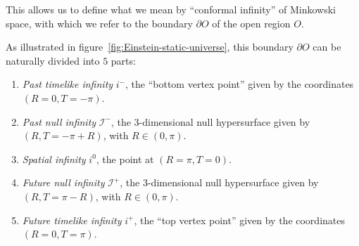 This allows us to define what we mean by ``conformal infinity'' of Minkowski space, with which we refer to the boundary \(\partial O\) of the open region \(O\).


As illustrated in figure~\ref{fig:Einstein-static-universe}, this boundary \(\partial O\) can be naturally divided into \(5\) parts:
\begin{enumerate}[label=(\arabic*)]
	\item \emph{Past timelike infinity} \(i^{-}\), the ``bottom vertex point'' given by the coordinates \((R = 0, T = -\pi)\).
	\item \emph{Past null infinity} \(\mathscr{I}^-\), the \(3\)-dimensional null hypersurface given by \((R, T = -\pi + R)\), with \(R \in (0, \pi)\).
	\item \emph{Spatial infinity} \(i^0\), the point at \((R=\pi, T = 0)\).
	\item \emph{Future null infinity} \(\mathscr{I}^+\), the \(3\)-dimensional null hypersurface given by \((R, T = \pi - R)\), with \(R \in (0, \pi)\).
	\item \emph{Future timelike infinity} \(i^{+}\), the ``top vertex point'' given by the coordinates \((R = 0, T = \pi)\).
\end{enumerate}

